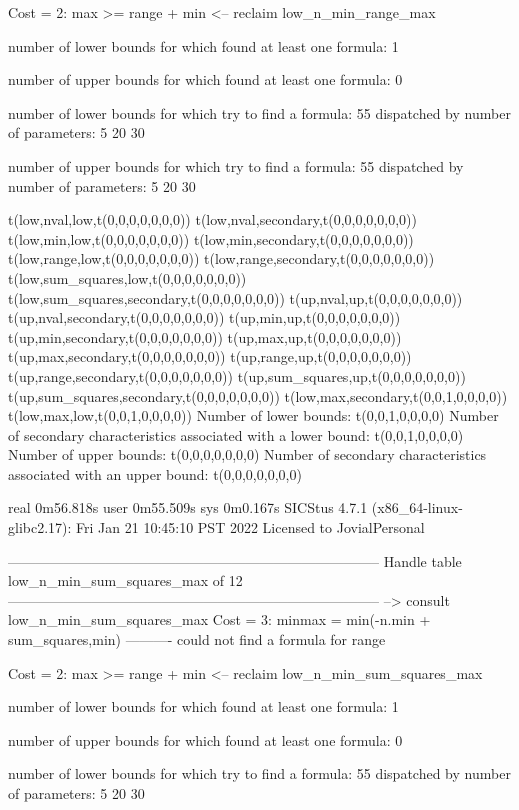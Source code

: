 Cost =  2:  max >= range + min
<-- reclaim low_n_min_range_max

number of lower bounds for which found at least one formula: 1

number of upper bounds for which found at least one formula: 0

number of lower bounds for which try to find a formula: 55
dispatched by number of parameters: 5  20  30

number of upper bounds for which try to find a formula: 55
dispatched by number of parameters: 5  20  30

t(low,nval,low,t(0,0,0,0,0,0,0))
t(low,nval,secondary,t(0,0,0,0,0,0,0))
t(low,min,low,t(0,0,0,0,0,0,0))
t(low,min,secondary,t(0,0,0,0,0,0,0))
t(low,range,low,t(0,0,0,0,0,0,0))
t(low,range,secondary,t(0,0,0,0,0,0,0))
t(low,sum_squares,low,t(0,0,0,0,0,0,0))
t(low,sum_squares,secondary,t(0,0,0,0,0,0,0))
t(up,nval,up,t(0,0,0,0,0,0,0))
t(up,nval,secondary,t(0,0,0,0,0,0,0))
t(up,min,up,t(0,0,0,0,0,0,0))
t(up,min,secondary,t(0,0,0,0,0,0,0))
t(up,max,up,t(0,0,0,0,0,0,0))
t(up,max,secondary,t(0,0,0,0,0,0,0))
t(up,range,up,t(0,0,0,0,0,0,0))
t(up,range,secondary,t(0,0,0,0,0,0,0))
t(up,sum_squares,up,t(0,0,0,0,0,0,0))
t(up,sum_squares,secondary,t(0,0,0,0,0,0,0))
t(low,max,secondary,t(0,0,1,0,0,0,0))
t(low,max,low,t(0,0,1,0,0,0,0))
Number of lower bounds:                                             t(0,0,1,0,0,0,0)
Number of secondary characteristics associated with a lower bound:  t(0,0,1,0,0,0,0)
Number of upper bounds:                                             t(0,0,0,0,0,0,0)
Number of secondary characteristics associated with an upper bound: t(0,0,0,0,0,0,0)

real	0m56.818s
user	0m55.509s
sys	0m0.167s
SICStus 4.7.1 (x86_64-linux-glibc2.17): Fri Jan 21 10:45:10 PST 2022
Licensed to JovialPersonal


--------------------------------------------------------------------------------
Handle table low_n_min_sum_squares_max of 12
--------------------------------------------------------------------------------
--> consult low_n_min_sum_squares_max
Cost =  3:  minmax = min(-n.min + sum_squares,min)
----------
could not find a formula for range

Cost =  2:  max >= range + min
<-- reclaim low_n_min_sum_squares_max

number of lower bounds for which found at least one formula: 1

number of upper bounds for which found at least one formula: 0

number of lower bounds for which try to find a formula: 55
dispatched by number of parameters: 5  20  30

